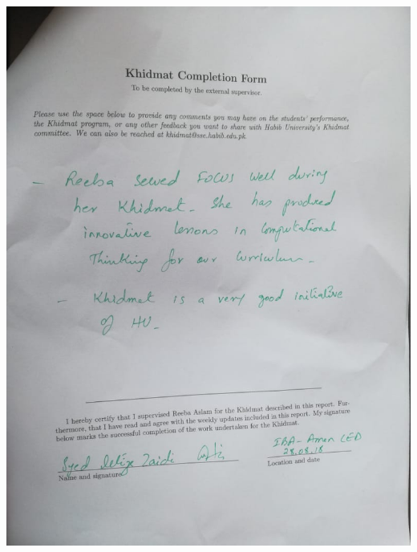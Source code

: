 \documentclass{article}
\begin{document}
\newpage
\includegraphics[width=\textwidth]{lastPage}

\end{document}
